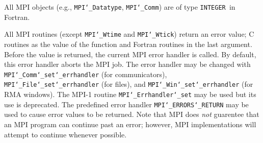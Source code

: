 All MPI objects (e.g., {\tt MPI{\tt \char`\_}Datatype}, {\tt MPI{\tt \char`\_}Comm}) are of type {\tt INTEGER
}in Fortran.
\par
{}
\par
All MPI routines (except {\tt MPI{\tt \char`\_}Wtime} and {\tt MPI{\tt \char`\_}Wtick}) return an error value;
C routines as the value of the function and Fortran routines in the last
argument.  Before the value is returned, the current MPI error handler is
called.  By default, this error handler aborts the MPI job.  The error handler
may be changed with {\tt MPI{\tt \char`\_}Comm{\tt \char`\_}set{\tt \char`\_}errhandler} (for communicators),
{\tt MPI{\tt \char`\_}File{\tt \char`\_}set{\tt \char`\_}errhandler} (for files), and {\tt MPI{\tt \char`\_}Win{\tt \char`\_}set{\tt \char`\_}errhandler} (for
RMA windows).  The MPI-1 routine {\tt MPI{\tt \char`\_}Errhandler{\tt \char`\_}set} may be used but
its use is deprecated.  The predefined error handler
{\tt MPI{\tt \char`\_}ERRORS{\tt \char`\_}RETURN} may be used to cause error values to be returned.
Note that MPI does {\em not} guarentee that an MPI program can continue past
an error; however, MPI implementations will attempt to continue whenever
possible.
\par
{}
\endmanpage
